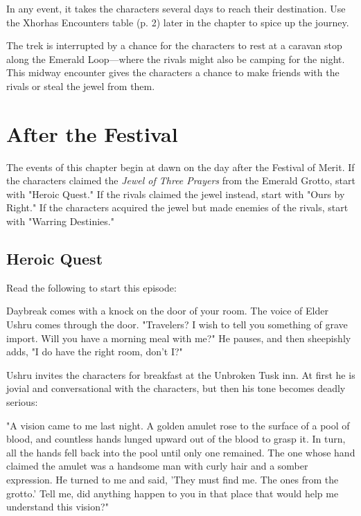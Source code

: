 \documentclass[a4paper, 11pt, bg=full, twocolumn, nooutline]{dndbook}
\begin{document}
In any event, it takes the characters several days to reach their destination. Use the Xhorhas Encounters table (p. 2) later in the chapter to spice up the journey.

The trek is interrupted by a chance for the characters to rest at a caravan stop along the Emerald Loop---where the rivals might also be camping for the night. This midway encounter gives the characters a chance to make friends with the rivals or steal the jewel from them.
\section{After the Festival}

The events of this chapter begin at dawn on the day after the Festival of Merit. If the characters claimed the \textit{Jewel of Three Prayers} from the Emerald Grotto, start with "Heroic Quest." If the rivals claimed the jewel instead, start with "Ours by Right." If the characters acquired the jewel but made enemies of the rivals, start with "Warring Destinies."

\subsection{Heroic Quest}

Read the following to start this episode:

\begin{DndReadAloud}
Daybreak comes with a knock on the door of your room. The voice of Elder Ushru comes through the door. "Travelers? I wish to tell you something of grave import. Will you have a morning meal with me?" He pauses, and then sheepishly adds, "I do have the right room, don't I?"
\end{DndReadAloud}

Ushru invites the characters for breakfast at the Unbroken Tusk inn. At first he is jovial and conversational with the characters, but then his tone becomes deadly serious:

\begin{DndReadAloud}
"A vision came to me last night. A golden amulet rose to the surface of a pool of blood, and countless hands lunged upward out of the blood to grasp it. In turn, all the hands fell back into the pool until only one remained. The one whose hand claimed the amulet was a handsome man with curly hair and a somber expression. He turned to me and said, 'They must find me. The ones from the grotto.' Tell me, did anything happen to you in that place that would help me understand this vision?"
\end{DndReadAloud}
\end{document}

